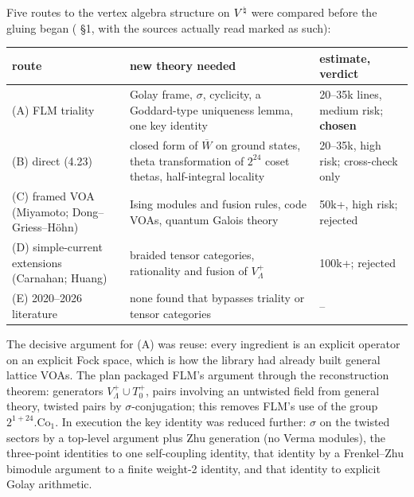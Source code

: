 Five routes to the vertex algebra structure on ${V^{\natural}}$ were compared before the gluing began
( \S1, with the sources actually read marked as such):
\begin{center}
\begin{tabular}{p{3.6cm}p{6.0cm}p{3.6cm}}
\toprule
route & new theory needed & estimate, verdict\\
\midrule
(A) FLM triality & Golay frame, $\sigma$, cyclicity, a Goddard-type uniqueness lemma, one key identity & 20--35k lines, medium risk; \textbf{chosen}\\
(B) direct (4.23) & closed form of $\overline W$ on ground states, theta transformation of $2^{24}$ coset thetas, half-integral locality & 20--35k, high risk; cross-check only\\
(C) framed VOA (Miyamoto; Dong--Griess--H\"ohn) & Ising modules and fusion rules, code VOAs, quantum Galois theory & 50k+, high risk; rejected\\
(D) simple-current extensions (Carnahan; Huang) & braided tensor categories, rationality and fusion of $V_\Lambda^+$ & 100k+; rejected\\
(E) 2020--2026 literature & none found that bypasses triality or tensor categories & --\\
\bottomrule
\end{tabular}
\end{center}
The decisive argument for (A) was reuse: every ingredient is an explicit operator on an explicit Fock
space, which is how the library had already built general lattice VOAs. The plan packaged FLM's
argument through the reconstruction theorem: generators $V_\Lambda^+\cup T_0^+$, pairs involving an
untwisted field from general theory, twisted pairs by $\sigma$-conjugation; this removes FLM's use
of the group $2^{1+24}.\mathrm{Co}_1$. In execution the key identity was reduced further: $\sigma$ on
the twisted sectors by a top-level argument plus Zhu generation (no Verma modules), the three-point
identities to one self-coupling identity, that identity by a Frenkel--Zhu bimodule argument to a
finite weight-2 identity, and that identity to explicit Golay arithmetic.

